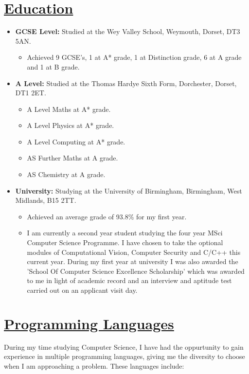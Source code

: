 \documentclass[11pt]{article}
\begin{document}
	
	\hspace{-100pt}\section*{\underline{Education}}
		\begin {itemize}
			\item \textbf{GCSE Level:}  Studied at the Wey Valley School, Weymouth, Dorset, DT3 5AN. 
				\begin{itemize}
					\item Achieved 9 GCSE's, 1 at A* grade, 1 at Distinction grade, 6 at A grade and 1 at B grade.
				\end{itemize} 
			\item \textbf{A Level:} Studied at the Thomas Hardye Sixth Form, Dorchester, Dorset, DT1 2ET.
				\begin{itemize}
					\item A Level Maths at A* grade.
					\item A Level Physics at A* grade.
					\item A Level Computing at A* grade.
					\item AS Further Maths at A grade.
					\item AS Chemistry at A grade.
				\end{itemize}
			\item \textbf{University:} Studying at the University of Birmingham, Birmingham, West Midlands, B15 2TT.
				\begin{itemize}
					\item Achieved an average grade of 93.8\% for my first year.
					\item I am currently a second year student studying the four year MSci Computer Science Programme. I have chosen to take the optional modules of Computational Vision, Computer Security and C/C++ this current year. During my first year at university I was also awarded the 'School Of Computer Science Excellence Scholarship' which was awarded to me in light of academic record and an interview and aptitude test carried out on an applicant visit day.
				\end{itemize}
		\end{itemize}
	\vspace{-3pt}
	\hspace{-100pt}\section*{\underline{Programming Languages}}
		During my time studying Computer Science, I have had the oppurtunity to gain experience in multiple programming languages, giving me the diversity to choose when I am approaching a problem. These languages include:
\end{document}
